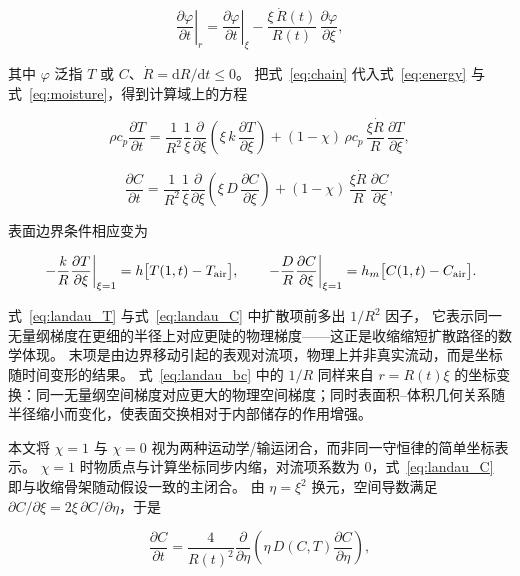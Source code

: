 \begin{equation}\label{eq:chain}
\left.\frac{\partial \varphi}{\partial t}\right|_{r}
=\left.\frac{\partial \varphi}{\partial t}\right|_{\xi}
-\frac{\xi\,\dot R(t)}{R(t)}\,\frac{\partial \varphi}{\partial \xi},
\end{equation}

其中 $\varphi$ 泛指 $T$ 或 $C$、$\dot R=\mathrm{d}R/\mathrm{d}t\le0$。
把式~\eqref{eq:chain} 代入式~\eqref{eq:energy} 与式~\eqref{eq:moisture}，得到计算域上的方程

\begin{equation}\label{eq:landau_T}
\rho c_p\frac{\partial T}{\partial t}
=\frac{1}{R^2}\frac{1}{\xi}\frac{\partial}{\partial \xi}\!\left(\xi\,k\,\frac{\partial T}{\partial \xi}\right)
+(1-\chi)\,\rho c_p\,\frac{\xi\dot R}{R}\,\frac{\partial T}{\partial \xi},
\end{equation}

\begin{equation}\label{eq:landau_C}
\frac{\partial C}{\partial t}
=\frac{1}{R^2}\frac{1}{\xi}\frac{\partial}{\partial \xi}\!\left(\xi\,D\,\frac{\partial C}{\partial \xi}\right)
+(1-\chi)\,\frac{\xi\dot R}{R}\,\frac{\partial C}{\partial \xi},
\end{equation}

表面边界条件相应变为

\begin{equation}\label{eq:landau_bc}
\left.-\frac{k}{R}\frac{\partial T}{\partial \xi}\right|_{\xi=1}=h\bigl[T(1,t)-T_{\rm air}\bigr],
\qquad
\left.-\frac{D}{R}\frac{\partial C}{\partial \xi}\right|_{\xi=1}=h_m\bigl[C(1,t)-C_{\rm air}\bigr].
\end{equation}

式~\eqref{eq:landau_T} 与式~\eqref{eq:landau_C} 中扩散项前多出 $1/R^2$ 因子，
它表示同一无量纲梯度在更细的半径上对应更陡的物理梯度——这正是收缩缩短扩散路径的数学体现。
末项是由边界移动引起的表观对流项，物理上并非真实流动，而是坐标随时间变形的结果。
式~\eqref{eq:landau_bc} 中的 $1/R$ 同样来自 $r=R(t)\xi$ 的坐标变换：同一无量纲空间梯度对应更大的物理空间梯度；同时表面积--体积几何关系随半径缩小而变化，使表面交换相对于内部储存的作用增强。

本文将 $\chi=1$ 与 $\chi=0$ 视为两种运动学/输运闭合，而非同一守恒律的简单坐标表示。
$\chi=1$ 时物质点与计算坐标同步内缩，对流项系数为 $0$，式~\eqref{eq:landau_C} 即与收缩骨架随动假设一致的主闭合。
由 $\eta=\xi^2$ 换元，空间导数满足 $\partial C/\partial\xi=2\xi\,\partial C/\partial\eta$，于是

\begin{equation}\label{eq:eta_C}
\frac{\partial C}{\partial t}
=\frac{4}{R(t)^2}\frac{\partial}{\partial\eta}\!\left(\eta\,D(C,T)\frac{\partial C}{\partial\eta}\right),
\end{equation}

